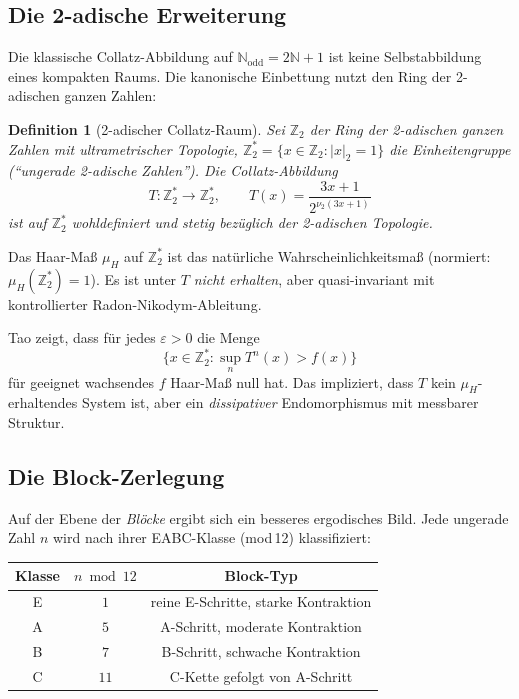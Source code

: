 \documentclass[12pt,a4paper]{article}
\newtheorem{definition}{Definition}[section]
\newcommand{\vii}{\nu_2}
\newcommand{\N}{\mathbb{N}}
\newcommand{\Ztwo}{\mathbb{Z}_2}
\newcommand{\atwo}[1]{\lvert#1\rvert_2}
\begin{document}
\subsection{Die 2-adische Erweiterung}

Die klassische Collatz-Abbildung auf $\N_{\text{odd}} = 2\N+1$ ist keine
Selbstabbildung eines kompakten Raums. Die kanonische Einbettung nutzt den
Ring der 2-adischen ganzen Zahlen:

\begin{definition}[2-adischer Collatz-Raum]
Sei $\Ztwo$ der Ring der 2-adischen ganzen Zahlen mit ultrametrischer Topologie,
$\Ztwo^* = \{x \in \Ztwo : \atwo{x} = 1\}$ die Einheitengruppe
(``ungerade 2-adische Zahlen''). Die Collatz-Abbildung
\[
  T\colon \Ztwo^* \to \Ztwo^*,
  \qquad
  T(x) = \frac{3x+1}{2^{\vii(3x+1)}}
\]
ist auf $\Ztwo^*$ wohldefiniert und \emph{stetig} bezüglich der 2-adischen Topologie.
\end{definition}

Das Haar-Maß $\mu_H$ auf $\Ztwo^*$ ist das natürliche Wahrscheinlichkeitsmaß
(normiert: $\mu_H(\Ztwo^*) = 1$). Es ist unter $T$ \emph{nicht erhalten}, aber
quasi-invariant mit kontrollierter Radon-Nikodym-Ableitung.

\begin{tcolorbox}[adisch, title={Tao (2019): Quasi-Invarianz}]
Tao zeigt, dass für jedes $\varepsilon > 0$ die Menge
\[
  \bigl\{x \in \Ztwo^* : \sup_n T^n(x) > f(x)\bigr\}
\]
für geeignet wachsendes $f$ Haar-Maß null hat. Das impliziert, dass
$T$ kein $\mu_H$-erhaltendes System ist, aber ein \emph{dissipativer}
Endomorphismus mit messbarer Struktur.
\end{tcolorbox}

\subsection{Die Block-Zerlegung}

Auf der Ebene der \emph{Blöcke} ergibt sich ein besseres ergodisches Bild.
Jede ungerade Zahl $n$ wird nach ihrer EABC-Klasse (mod\,12) klassifiziert:

\begin{center}
\renewcommand{\arraystretch}{1.2}
\begin{tabular}{ccc}
\toprule
Klasse & $n \bmod 12$ & Block-Typ \\
\midrule
E & $1$ & reine E-Schritte, starke Kontraktion \\
A & $5$ & A-Schritt, moderate Kontraktion \\
B & $7$ & B-Schritt, schwache Kontraktion \\
C & $11$ & C-Kette gefolgt von A-Schritt \\
\bottomrule
\end{tabular}
\end{center}
\end{document}
